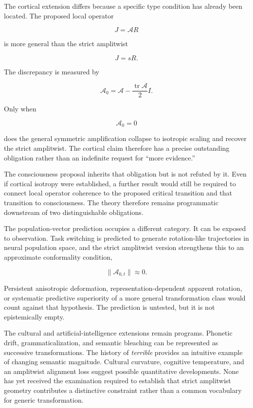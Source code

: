 \documentclass[11pt]{article}
\begin{document}
The cortical extension differs because a specific type condition has already been located. The proposed local operator

\begin{equation}
J=\mathcal A R
\end{equation}

is more general than the strict amplitwist

\begin{equation}
J=sR.
\end{equation}

The discrepancy is measured by

\begin{equation}
\mathcal A_0
=
\mathcal A
-
\frac{\operatorname{tr}\mathcal A}{2}I.
\end{equation}

Only when

\begin{equation}
\boxed{
\mathcal A_0=0
}
\end{equation}

does the general symmetric amplification collapse to isotropic scaling and recover the strict amplitwist. The cortical claim therefore has a precise outstanding obligation rather than an indefinite request for ``more evidence.''

The consciousness proposal inherits that obligation but is not refuted by it. Even if cortical isotropy were established, a further result would still be required to connect local operator coherence to the proposed critical transition and that transition to consciousness. The theory therefore remains programmatic downstream of two distinguishable obligations.

The population-vector prediction occupies a different category. It can be exposed to observation. Task switching is predicted to generate rotation-like trajectories in neural population space, and the strict amplitwist version strengthens this to an approximate conformality condition,

\begin{equation}
\|\mathcal A_{0,t}\|\approx0.
\end{equation}

Persistent anisotropic deformation, representation-dependent apparent rotation, or systematic predictive superiority of a more general transformation class would count against that hypothesis. The prediction is untested, but it is not epistemically empty.

The cultural and artificial-intelligence extensions remain programs. Phonetic drift, grammaticalization, and semantic bleaching can be represented as successive transformations. The history of \emph{terrible} provides an intuitive example of changing semantic magnitude. Cultural curvature, cognitive temperature, and an amplitwist alignment loss suggest possible quantitative developments. None has yet received the examination required to establish that strict amplitwist geometry contributes a distinctive constraint rather than a common vocabulary for generic transformation.
\end{document}

